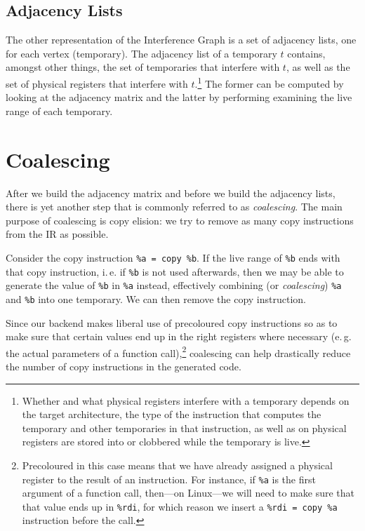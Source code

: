 \documentclass[12pt]{report}
\newcommand\ie{i.\,e.}
\newcommand\eg{e.\,g.}
\begin{document}
\subsection{Adjacency Lists}
The other representation of the Interference Graph is a set of adjacency lists, one for each vertex (temporary). The adjacency list of a
temporary $t$ contains, amongst other things, the set of temporaries that interfere with $t$, as well as the set of physical registers that
interfere with $t$.\footnote{Whether and what physical registers interfere with a temporary depends on the target architecture, the type of
the instruction that computes the temporary and other temporaries in that instruction, as well as on  physical registers are stored into
or clobbered while the temporary is live.} The former can be computed by looking at the adjacency matrix and the latter by performing
examining the live range of each temporary.

\section{Coalescing}
After we build the adjacency matrix and before we build the adjacency lists, there is yet another step that is commonly referred to as
\textit{coalescing}. The main purpose of coalescing is copy elision: we try to remove as many copy instructions from the IR as possible.

Consider the copy instruction \verb|%a = copy %b|. If the live range of \verb|%b| ends with that copy instruction, \ie{} if \verb|%b| is not
used afterwards, then we may be able to generate the value of \verb|%b| in \verb|%a| instead, effectively combining (or \textit{coalescing})
\verb|%a| and \verb|%b| into one temporary. We can then remove the copy instruction.

Since our backend makes liberal use of precoloured copy instructions so as to make sure that certain values end up in the right registers
where necessary (\eg{} the actual parameters of a function call),\footnote{Precoloured in this case means that we have already assigned a
physical register to the result of an instruction. For instance, if \texttt{\%a} is the first argument of a function call, then—on Linux—we
will need to make sure that that value ends up in \texttt{\%rdi}, for which reason we insert a \texttt{\%rdi = copy \%a} instruction before
the call.} coalescing can help drastically reduce the number of copy instructions in the generated code.
\end{document}

